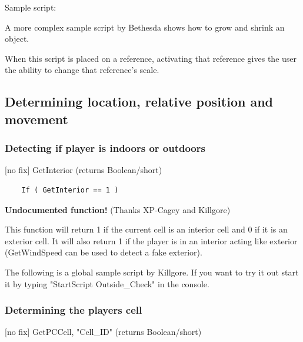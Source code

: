 Sample script:

A more complex sample script by Bethesda shows how to grow and shrink an
object.

When this script is placed on a reference, activating that reference
gives the user the ability to change that reference's scale.



\hypertarget{determining-location-relative-position-and-movement}{%
\subsection{\texorpdfstring{\hfill\break
Determining location, relative position and
movement}{ Determining location, relative position and movement}}\label{determining-location-relative-position-and-movement}}

\hypertarget{detecting-if-player-is-indoors-or-outdoors}{%
\subsubsection{Detecting if player is indoors or
outdoors}\label{detecting-if-player-is-indoors-or-outdoors}}

{[}no fix{]} GetInterior (returns Boolean/short)

\begin{lstlisting}
	If ( GetInterior == 1 )
\end{lstlisting}

\textbf{Undocumented function!} (Thanks XP-Cagey and Killgore)

This function will return 1 if the current cell is an interior cell and
0 if it is an exterior cell. It will also return 1 if the player is in
an interior acting like exterior (GetWindSpeed can be used to detect a
fake exterior).

The following is a global sample script by Killgore. If you want to try
it out start it by typing "StartScript Outside\_Check" in the console.



\hypertarget{determining-the-players-cell}{%
\subsubsection{Determining the players
cell}\label{determining-the-players-cell}}

{[}no fix{]} GetPCCell, "Cell\_ID" (returns Boolean/short)

